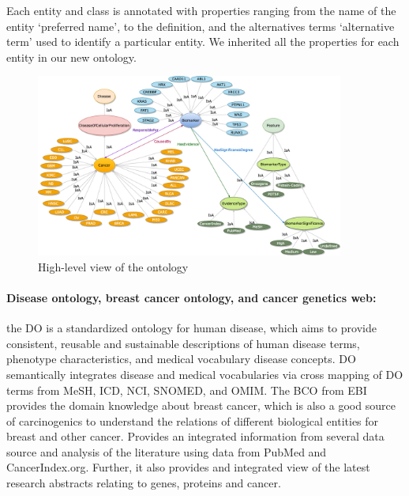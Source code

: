 \vspace{-2mm}
\hspace*{3.5mm} Each entity and class is annotated with properties ranging from the name of the entity `preferred name', to the definition, and the alternatives terms `alternative term' used to identify a particular entity. We inherited all the properties for each entity in our new ontology.

\begin{figure}
	\centering
	\includegraphics[width=0.8\linewidth,height=60mm]{images/diagram_general_view.png}
	\caption{High-level view of the ontology} 
	\label{fig:main_ontology}
\end{figure}

\paragraph{Disease ontology, breast cancer ontology, and cancer genetics web:} \hspace*{-2.5mm} the DO is a standardized ontology for human disease, which aims to provide consistent, reusable and sustainable descriptions of human disease terms, phenotype characteristics, and medical vocabulary disease concepts. DO semantically integrates disease and medical vocabularies via cross mapping of DO terms from MeSH, ICD, NCI, SNOMED, and OMIM. The BCO from EBI provides the domain knowledge about breast cancer, which is also a good source of carcinogenics to understand the relations of different biological entities for breast and other cancer. Provides an integrated information from several data source and analysis of the literature using data from PubMed and CancerIndex.org. Further, it also provides and integrated view of the latest research abstracts relating to genes, proteins and cancer.  


